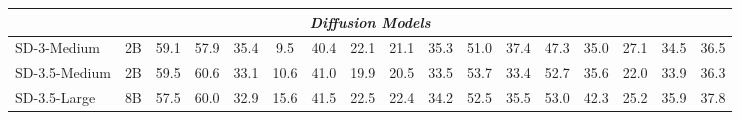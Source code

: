 \begin{table}[t]
{\begin{tabular}{lcccccccccccccccc}
\multicolumn{17}{c}{\textit{\textbf{Diffusion Models}}}                                                                                                                                                                                                                                                                                                                                                                                                                                                                                                                                                                                                                                                                        \\ \midrule
SD-3-Medium                      & 2B                                 & 59.1                                 & 57.9                                 & 35.4                                 & 9.5                                  & \cellcolor[HTML]{E2E2E2}40.4                                 & 22.1                                 & 21.1                                 & 35.3                                 & 51.0                                 & 37.4                                 & 47.3                                 & 35.0                                 & 27.1                                 & \cellcolor[HTML]{E2E2E2}34.5                                 & 36.5                                 \\
SD-3.5-Medium                    & 2B                                 & 59.5                                 & 60.6                                 & 33.1                                 & 10.6                                 & \cellcolor[HTML]{E2E2E2}41.0                                 & 19.9                                 & 20.5                                 & 33.5                                 & 53.7                                 & 33.4                                 & 52.7                                 & 35.6                                 & 22.0                                 & \cellcolor[HTML]{E2E2E2}33.9                                 & 36.3                                 \\
SD-3.5-Large                     & 8B                                 & 57.5                                 & 60.0                                 & 32.9                                 & 15.6                                 & \cellcolor[HTML]{E2E2E2}41.5                                 & 22.5                                 & 22.4                                 & 34.2                                 & 52.5                                 & 35.5                                 & 53.0                                 & 42.3                                 & 25.2                                 & \cellcolor[HTML]{E2E2E2}35.9                                 & 37.8                                 \\

\end{tabular}}
\end{table}

